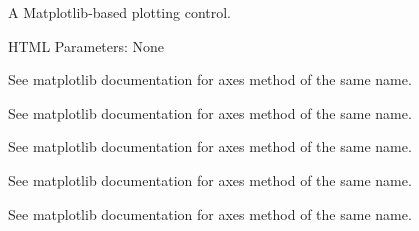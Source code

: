 \documentclass[letterpaper,10pt,english]{sphinxmanual}
\begin{document}
\begin{fulllineitems}
\label{api:deprecated.MPLPlot}
A Matplotlib-based plotting control.

HTML Parameters: None

\begin{fulllineitems}
\label{api:deprecated.MPLPlot.acorr}
See matplotlib documentation for axes method of the same name.

\end{fulllineitems}


\begin{fulllineitems}
\label{api:deprecated.MPLPlot.add_artist}
See matplotlib documentation for axes method of the same name.

\end{fulllineitems}


\begin{fulllineitems}
\label{api:deprecated.MPLPlot.add_callback}
See matplotlib documentation for axes method of the same name.

\end{fulllineitems}


\begin{fulllineitems}
\label{api:deprecated.MPLPlot.add_collection}
See matplotlib documentation for axes method of the same name.

\end{fulllineitems}


\begin{fulllineitems}
\label{api:deprecated.MPLPlot.add_container}
See matplotlib documentation for axes method of the same name.


\end{fulllineitems}
\end{fulllineitems}
\end{document}
